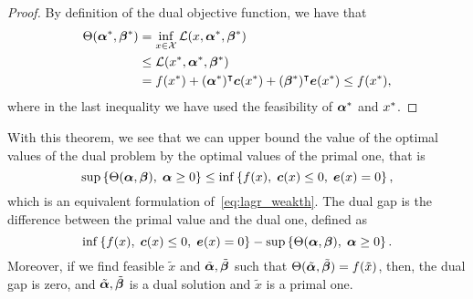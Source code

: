 \begin{proof}
    By definition of the dual objective function, we have that 
    \begin{align*}
        \Theta({\bm{\alpha}}^*, {\bm{\beta}}^*) &= \inf_{x \in \mathcal{X}} \mathcal{L}(x, {\bm{\alpha}}^*, {\bm{\beta}}^*) \\
        &\leq \mathcal{L}({x}^*, {\bm{\alpha}}^*, {\bm{\beta}}^*) \\
        &= f({x}^*) + ({\bm{\alpha}}^*)^\intercal \bm{c}({x}^*) + ({\bm{\beta}}^*)^\intercal \bm{e}({x}^*) \leq f({x}^*) ,
    \end{align*}
    where in the last inequality we have used the feasibility of ${\bm{\alpha}}^*$ and ${x}^*$.
\end{proof}
With this theorem, we see that we can upper bound the value of the optimal values of the dual problem by the optimal values of the primal one, that is 
\begin{equation}
    \nonumber
    \sup \left\{\Theta(\bm{\alpha}, \bm{\beta}),\;  \bm{\alpha} \geq 0\right\} \leq \inf \left\{f(x), \; \bm{c}(x) \leq 0,\; \bm{e}(x)=0 \right\} ,
\end{equation}
which is an equivalent formulation of~\eqref{eq:lagr_weakth}.
The dual gap is the difference between the primal value and the dual one, defined as 
\begin{equation}
    \nonumber
    \inf \left\{f(x), \; \bm{c}(x) \leq 0,\; \bm{e}(x)=0 \right\} - \sup \left\{\Theta(\bm{\alpha}, \bm{\beta}),\;  \bm{\alpha} \geq 0\right\} .
\end{equation}
Moreover, if we find feasible $\tilde{x}$ and $\tilde{\bm{\alpha}}, \tilde{\bm{\beta}}$ such that $\Theta(\tilde{\bm{\alpha}}, \tilde{\bm{\beta}}) = f(\tilde{x})$, then, the dual gap is zero, and $\tilde{\bm{\alpha}}, \tilde{\bm{\beta}}$ is a dual solution and $\tilde{x}$ is a primal one.
%

